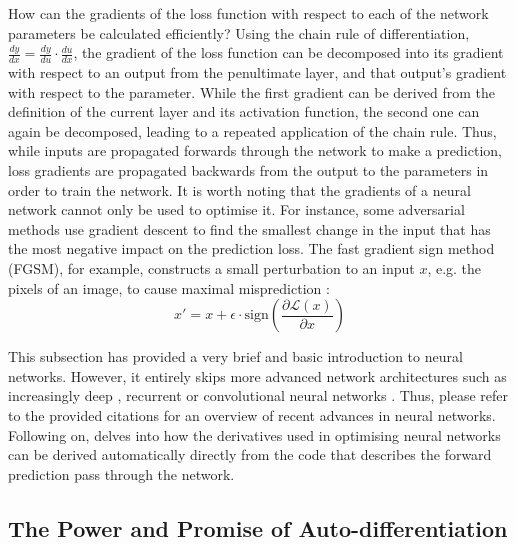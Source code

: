 \newpar How can the gradients of the loss function with respect to each of the network parameters be calculated efficiently? Using the chain rule of differentiation, $\frac{dy}{dx} = \frac{dy}{du} \cdot \frac{du}{dx}$, the gradient of the loss function can be decomposed into its gradient with respect to an output from the penultimate layer, and that output's gradient with respect to the parameter. While the first gradient can be derived from the definition of the current layer and its activation function, the second one can again be decomposed, leading to a repeated application of the chain rule. Thus, while inputs are propagated forwards through the network to make a prediction, loss gradients are propagated backwards from the output to the parameters in order to train the network. It is worth noting that the gradients of a neural network cannot only be used to optimise it. For instance, some adversarial methods use gradient descent to find the smallest change in the input that has the most negative impact on the prediction loss. The fast gradient sign method (FGSM), for example, constructs a small perturbation to an input $x$, e.g. the pixels of an image, to cause maximal misprediction \cite{fast-gradient-2014}:
\begin{equation*}
    x' = x + \epsilon \cdot \text{sign} \left( \frac{\partial \mathcal{L}(x)}{\partial x} \right)
\end{equation*}

\noindent This subsection has provided a very brief and basic introduction to neural networks. However, it entirely skips more advanced network architectures such as increasingly deep \cite{deep-learning-2019}, recurrent \cite{recurrent-nns-2019} or convolutional neural networks \cite{cnn-1990, cnn-review-2022}. Thus, please refer to the provided citations for an overview of recent advances in neural networks. Following on,  delves into how the derivatives used in optimising neural networks can be derived automatically directly from the code that describes the forward prediction pass through the network.

\subsection{The Power and Promise of Auto-differentiation} \label{txt:auto-differentiation}

